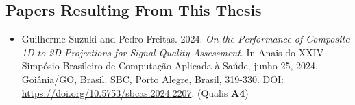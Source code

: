 \documentclass[bacharelado]{UnB-CIC}%
\begin{document}
%
	

    
    

    \begin{appendices}
        \chapter{Papers Resulting From This Thesis}
        \begin{itemize}
            \item Guilherme Suzuki and Pedro Freitas. 2024. \textit{On the Performance of Composite 1D-to-2D Projections for Signal Quality Assessment}. In Anais do XXIV Simpósio Brasileiro de Computação Aplicada à Saúde, junho 25, 2024, Goiânia/GO, Brasil. SBC, Porto Alegre, Brasil, 319-330. DOI: \url{https://doi.org/10.5753/sbcas.2024.2207}. (Qualis \textbf{A4})
        \end{itemize}
        
        
    \end{appendices}
\end{document}
